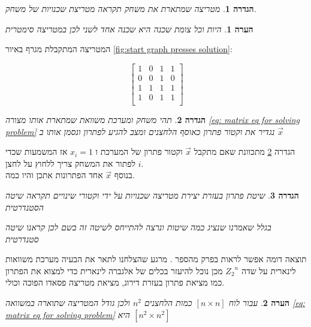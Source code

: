\documentclass[12pt,twoside]{article}
\newtheorem{definition}{הגדרה}[section]
\newtheorem{comm}{הערה}[section]
\newcommand{\Zn}{{Z_2}^n}
\begin{document}
\begin{definition}
    \label{def: neighbor matrix}
    מטריצה שמתארת את משחק תקראה מטריצת שכנויות של משחק.
\end{definition}


\begin{comm}
    \label{comm: symetic matrix}
    היות וכל צומת שכנה היא שכנה אחד לשני לכן במטריצה
    סימטרית
\end{comm}

המטריצה  המתקבלת מגרף באיור 
\ref{fig:start graph presses solution}:

\[
    \begin{bmatrix}
        1 & 0 & 1 & 1\\
        0 & 0 & 1 & 0\\
        1 & 1 & 1 & 1\\
        1 & 0 & 1 & 1\\
    \end{bmatrix}
\]


\begin{definition}
    \label{ def: solution vector}
    תהי משחק ומערכת משוואת שמתארת אותו מצורה 
    \ref{eq: matrix eq for solving problem} 
    נגדיר את וקטור פתרון כאוסף הלחצנים ומצב להגיע לפתרון
    ונסמן אותו ב
    $\vec{x}$
\end{definition}

הגדרה 
\ref{ def: solution vector}
מתכוונת שאם מתקבל
$\vec{x}$
וקטור פתרון של המערכת 
ו
$x_i = 1$
אז המשמעות שכדי לפתור את המשחק
צריך ללחוץ על לחצן 
$i$.
\\
בנוסף 
$\vec{x}$
אחד הפתרונות אתכן והיו כמה.

\begin{definition}
    \label{def: standard solution}
    שיטת פתרון בעזרת יצירת  מטריצה שכנויות על ידי וקטורי שינויים תקראה שיטה הסטנדרטית

    בגלל שאמרנו שנציג כמה שיטות ונרצה להתייחס לשיטה זה בשם לכן קראנו שיטה סטנדרטית
\end{definition}

תוצאה דומה אפשר לראות בפרק מהספר
\cite{B2}.
מרגע שהצלחנו לתאר את הבעיה מערכת משוואות לינארית
על שדה
$\Zn$
מכן נוכל להיעזר בכלים של אלגברה לינארית כדי למצוא את הפתרון כמו מציאת פתרון בעזרת דירוג,
מציאת מטריצה פסאדו הפוכה וכולי. 

\begin{comm}
    \label{comm: for board too many variables}
    עבור לוח 
$[n \times n]$
כמות הלחצנים 
$n^2$
ולכן גודל המטריצה שתוארה במשוואה
\ref{eq: matrix eq for solving problem}
היא 
$[n^2 \times n^2]$
\end{comm}
\end{document}
